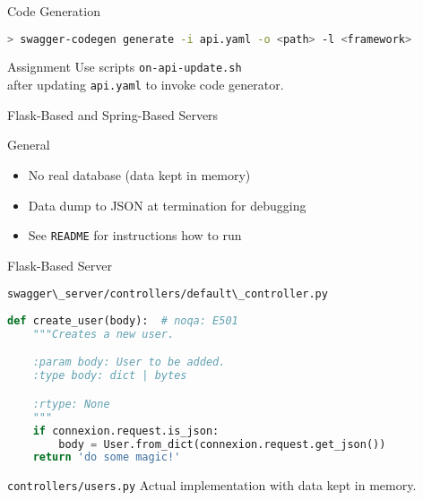 \begin{frame}[fragile]{Code Generation}
\begin{lstlisting}[language=bash,style=mini]
> swagger-codegen generate -i api.yaml -o <path> -l <framework>
\end{lstlisting}

    \begin{block}{Assignment}
        Use scripts \lstinline|on-api-update.sh| \\
        after updating \lstinline{api.yaml} to invoke code generator.
    \end{block}
\end{frame}


\begin{frame}{Flask-Based and Spring-Based Servers}
    \begin{block}{General}
        \begin{itemize}
            \item No real database (data kept in memory)
            \item Data dump to JSON at termination for debugging
            \item See \lstinline{README} for instructions how to run
        \end{itemize}
    \end{block}
\end{frame}


\begin{frame}[fragile]{Flask-Based Server}
\begin{block}{\lstinline{swagger\_server/controllers/default\_controller.py}}
\begin{lstlisting}[language=python,style=mini]
def create_user(body):  # noqa: E501
    """Creates a new user.

    :param body: User to be added.
    :type body: dict | bytes

    :rtype: None
    """
    if connexion.request.is_json:
        body = User.from_dict(connexion.request.get_json())
    return 'do some magic!'
\end{lstlisting}
\end{block}

    \begin{block}{\lstinline{controllers/users.py}}
        Actual implementation with data kept in memory.
    \end{block}
\end{frame}


